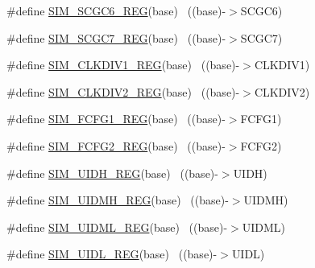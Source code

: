 \begin{DoxyCompactItemize}
\item 
\#define \hyperlink{group___s_i_m___register___accessor___macros_ga0d700471b59fa17a37db41eea9ac34d4}{S\+I\+M\+\_\+\+S\+C\+G\+C6\+\_\+\+R\+EG}(base)                                        ~((base)-\/$>$S\+C\+G\+C6)
\item 
\#define \hyperlink{group___s_i_m___register___accessor___macros_ga8524b7aa144aa516fbbc9ac2da38c7b0}{S\+I\+M\+\_\+\+S\+C\+G\+C7\+\_\+\+R\+EG}(base)                                        ~((base)-\/$>$S\+C\+G\+C7)
\item 
\#define \hyperlink{group___s_i_m___register___accessor___macros_ga9a2e39cdabbfa7d094a5442016be4dd0}{S\+I\+M\+\_\+\+C\+L\+K\+D\+I\+V1\+\_\+\+R\+EG}(base)                                    ~((base)-\/$>$C\+L\+K\+D\+I\+V1)
\item 
\#define \hyperlink{group___s_i_m___register___accessor___macros_gaddf08644ec398256d25e6106daad245b}{S\+I\+M\+\_\+\+C\+L\+K\+D\+I\+V2\+\_\+\+R\+EG}(base)                                    ~((base)-\/$>$C\+L\+K\+D\+I\+V2)
\item 
\#define \hyperlink{group___s_i_m___register___accessor___macros_ga6cc80fd9f1edfd8f709d2c8fe3c97080}{S\+I\+M\+\_\+\+F\+C\+F\+G1\+\_\+\+R\+EG}(base)                                        ~((base)-\/$>$F\+C\+F\+G1)
\item 
\#define \hyperlink{group___s_i_m___register___accessor___macros_ga8e1caad19971280346dc9c767c8f4b6e}{S\+I\+M\+\_\+\+F\+C\+F\+G2\+\_\+\+R\+EG}(base)                                        ~((base)-\/$>$F\+C\+F\+G2)
\item 
\#define \hyperlink{group___s_i_m___register___accessor___macros_ga2c1fe45ab77b346f67b2f3bb2f59519a}{S\+I\+M\+\_\+\+U\+I\+D\+H\+\_\+\+R\+EG}(base)                                          ~((base)-\/$>$U\+I\+DH)
\item 
\#define \hyperlink{group___s_i_m___register___accessor___macros_gaffd69cc3f48c0e204d8c659424b4c51d}{S\+I\+M\+\_\+\+U\+I\+D\+M\+H\+\_\+\+R\+EG}(base)                                        ~((base)-\/$>$U\+I\+D\+MH)
\item 
\#define \hyperlink{group___s_i_m___register___accessor___macros_gaac80320f7e56ccd1cd6b54cfdc322430}{S\+I\+M\+\_\+\+U\+I\+D\+M\+L\+\_\+\+R\+EG}(base)                                        ~((base)-\/$>$U\+I\+D\+ML)
\item 
\#define \hyperlink{group___s_i_m___register___accessor___macros_ga50225b2615456e0a763efbe4ec59b077}{S\+I\+M\+\_\+\+U\+I\+D\+L\+\_\+\+R\+EG}(base)                                          ~((base)-\/$>$U\+I\+DL)

\end{DoxyCompactItemize}
